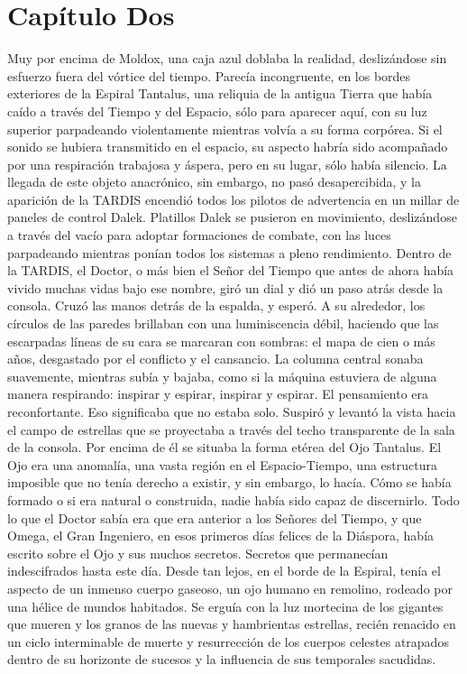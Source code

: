 \chapter*{Capítulo Dos}

Muy por encima de Moldox, una caja azul doblaba la realidad, deslizándose sin esfuerzo fuera del vórtice del tiempo. Parecía incongruente, en los bordes exteriores de la Espiral Tantalus, una reliquia de la antigua Tierra que había caído a través del Tiempo y del Espacio, sólo para aparecer aquí, con su luz superior parpadeando violentamente mientras volvía a su forma corpórea. Si el sonido se hubiera transmitido en el espacio, su aspecto habría sido acompañado por una respiración trabajosa y áspera, pero en su lugar, sólo había silencio.
La llegada de este objeto anacrónico, sin embargo, no pasó desapercibida, y la aparición de la TARDIS encendió todos los pilotos de advertencia en un millar de paneles de control Dalek. Platillos Dalek se pusieron en movimiento, deslizándose a través del vacío para adoptar formaciones de combate, con las luces parpadeando mientras ponían todos los sistemas a pleno rendimiento.
Dentro de la TARDIS, el Doctor, o más bien el Señor del Tiempo que antes de ahora había vivido muchas vidas bajo ese nombre, giró un dial y dió un paso atrás desde la consola. Cruzó las manos detrás de la espalda, y esperó.
A su alrededor, los círculos de las paredes brillaban con una luminiscencia débil, haciendo que las escarpadas líneas de su cara se marcaran con sombras: el mapa de cien o más años, desgastado por el conflicto y el cansancio.
La columna central sonaba suavemente, mientras subía y bajaba, como si la máquina estuviera de alguna manera respirando: inspirar y espirar, inspirar y espirar. El pensamiento era reconfortante. Eso significaba que no estaba solo. Suspiró y levantó la vista hacia el campo de estrellas que se proyectaba a través del techo transparente de la sala de la consola. Por encima de él se situaba la forma etérea del Ojo Tantalus.
El Ojo era una anomalía, una vasta región en el Espacio-Tiempo, una estructura imposible que no tenía derecho a existir, y sin embargo, lo hacía. Cómo se había formado o si era natural o construida, nadie había sido capaz de discernirlo. Todo lo que el Doctor sabía era que era anterior a los Señores del Tiempo, y que Omega, el Gran Ingeniero, en esos primeros días felices de la Diáspora, había escrito sobre el Ojo y sus muchos secretos. Secretos que permanecían indescifrados hasta este día.
Desde tan lejos, en el borde de la Espiral, tenía el aspecto de un inmenso cuerpo gaseoso, un ojo humano en remolino, rodeado por una hélice de mundos habitados. Se erguía con la luz mortecina de los gigantes que mueren y los granos de las nuevas y hambrientas estrellas, recién renacido en un ciclo interminable de muerte y resurrección de los cuerpos celestes atrapados dentro de su horizonte de sucesos y la influencia de sus temporales sacudidas.

